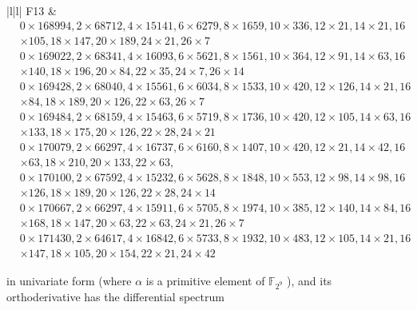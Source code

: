 \documentclass[10pt]{article}
\begin{document}
\begin{table}[h]
\begin{center}
\begin{tabular}{|l|l|}
F13 & \( \begin{aligned} & 0 \times 168994,2 \times 68712,4 \times 15141,6 \times 6279,8 \times 1659,10 \times 336,12 \times 21,14 \times 21,16 \\ & \times 105,18 \times 147,20 \times 189,24 \times 21,26 \times 7 \\ & 0 \times 169022,2 \times 68341,4 \times 16093,6 \times 5621,8 \times 1561,10 \times 364,12 \times 91,14 \times 63,16 \\ & \times 140,18 \times 196,20 \times 84,22 \times 35,24 \times 7,26 \times 14 \\ & 0 \times 169428,2 \times 68040,4 \times 15561,6 \times 6034,8 \times 1533,10 \times 420,12 \times 126,14 \times 21,16 \\ & \times 84,18 \times 189,20 \times 126,22 \times 63,26 \times 7 \\ & 0 \times 169484,2 \times 68159,4 \times 15463,6 \times 5719,8 \times 1736,10 \times 420,12 \times 105,14 \times 63,16 \\ & \times 133,18 \times 175,20 \times 126,22 \times 28,24 \times 21 \\ & 0 \times 170079,2 \times 66297,4 \times 16737,6 \times 6160,8 \times 1407,10 \times 420,12 \times 21,14 \times 42,16 \\ & \times 63,18 \times 210,20 \times 133,22 \times 63, \\ & 0 \times 170100,2 \times 67592,4 \times 15232,6 \times 5628,8 \times 1848,10 \times 553,12 \times 98,14 \times 98,16 \\ & \times 126,18 \times 189,20 \times 126,22 \times 28,24 \times 14 \\ & 0 \times 170667,2 \times 66297,4 \times 15911,6 \times 5705,8 \times 1974,10 \times 385,12 \times 140,14 \times 84,16 \\ & \times 168,18 \times 147,20 \times 63,22 \times 63,24 \times 21,26 \times 7 \\ & 0 \times 171430,2 \times 64617,4 \times 16842,6 \times 5733,8 \times 1932,10 \times 483,12 \times 105,14 \times 21,16 \\ & \times 147,18 \times 105,20 \times 154,22 \times 21,24 \times 42 \end{aligned} \) \\
\hline
\end{tabular}
\end{center}
\end{table}

in univariate form (where $\alpha$ is a primitive element of $\mathbb{F}_{2^{9}}$ ), and its orthoderivative has the differential spectrum
\end{document}
